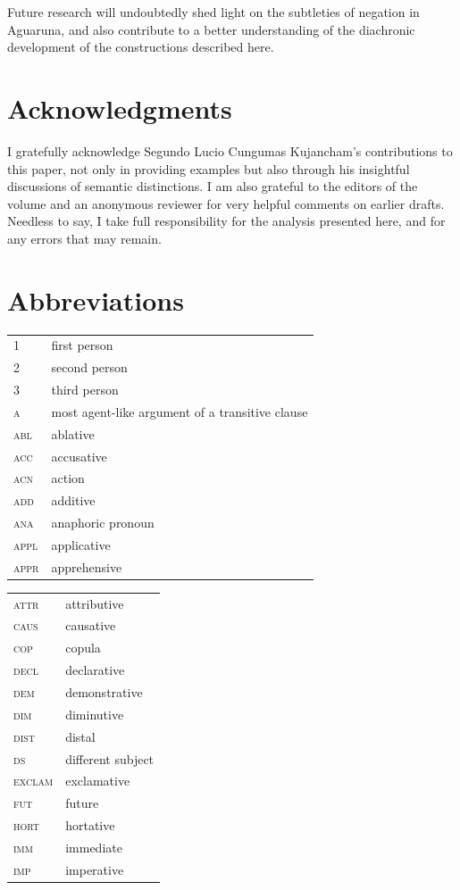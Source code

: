 \documentclass[output=paper,colorlinks,citecolor=brown,draft]{langscibook}
\begin{document}
Future research will undoubtedly shed light on the subtleties of negation in Aguaruna, and also contribute to a better understanding of the diachronic development of the constructions described here.

\section*{Acknowledgments}
\largerpage[2]
I gratefully acknowledge Segundo Lucio Cungumas Kujancham’s contributions to this paper, not only in providing examples but also through his insightful discussions of semantic distinctions. I am also grateful to the editors of the volume and an anonymous reviewer for very helpful comments on earlier drafts. Needless to say, I take full responsibility for the analysis presented here, and for any errors that may remain.

\section*{Abbreviations}

\begin{tabularx}{.45\textwidth}{lQ}
1 & first person \\
2 & second person \\
3 & third person \\
\scshape a & most agent-like argument of a transitive clause \\
\scshape abl & ablative \\
\scshape acc & accusative \\
\scshape acn & action  \\
\scshape add & additive \\
\scshape ana & anaphoric pronoun \\
\scshape appl & applicative \\
\scshape appr & apprehensive \\
\end{tabularx}
\begin{tabularx}{.45\textwidth}{lQ}
\scshape attr & attributive \\
\scshape caus & causative \\
\scshape cop & copula \\
\scshape decl & declarative \\
\scshape dem & demonstrative \\
\scshape dim & diminutive \\
\scshape dist & distal \\
\scshape ds & different subject \\
\scshape exclam & exclamative \\
\scshape fut & future \\
\scshape hort & hortative \\
\scshape imm & immediate \\
\scshape imp & imperative \\
\end{tabularx}
\end{document}
